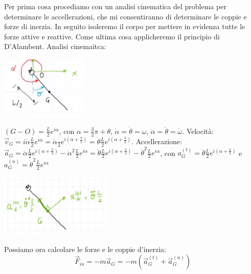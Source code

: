 \newline
Per prima cosa procediamo con un analisi cinematica del problema per determinare le accellerazioni, che mi consentiranno di determinare le coppie e forze di inerzia.\newline
In seguito isoleremo il corpo per mettere in evidenza tutte le forze attive e reattive.\newline
Come ultima cosa applicheremo il principio di D'Alambent.\newline
\newline
Analisi cinemaitca:
\begin{center}
    \includegraphics[height=3cm]{../lezione9/img5.JPG}
\end{center}
 $(G-O) = \frac{L}{2}e^{i \alpha}$, con $\alpha = \frac{3}{2} \pi + \theta$, $\dot{\alpha} = \dot{\theta} = \omega$, $\ddot{\alpha} = \ddot{\theta} = \dot{\omega}$.\newline
Velocità: $\vec{v}_G = i \dot{\alpha} \frac{L}{2} e^{i \alpha} = \dot{\alpha} \frac{}{2} e^{i (\alpha + \frac{\pi}{2})} = \dot{\theta} \frac{L}{2} e^{i (\alpha + \frac{\pi}{2})}$.\newline
Accellerazione: $\vec{a}_G = \ddot{\alpha} \frac{L}{2} e^{i (\alpha + \frac{\pi}{2})} - \dot{\alpha}^2 \frac{L}{2} e^{i \alpha} = \ddot{\theta} \frac{L}{2} e^{i (\alpha + \frac{\pi}{2})} - \dot{\theta}^2 \frac{L}{2} e^{i \alpha}$, con $a^{(t)}_G = \ddot{\theta} \frac{L}{2} e^{i (\alpha + \frac{\pi}{2})}$ e $a^{(n)}_G = \dot{\theta}^2 \frac{L}{2} e^{i \alpha}$
\begin{center}
    \includegraphics[height=3cm]{../lezione9/img6.JPG}
\end{center}
Possiamo ora calcolare le forze e le coppie d'inerzia:
\[
    \vec{F}_{in} = - m \vec{a}_G = - m (\vec{a}_G^{(t)} + \vec{a}_G^{(n)})
\]
